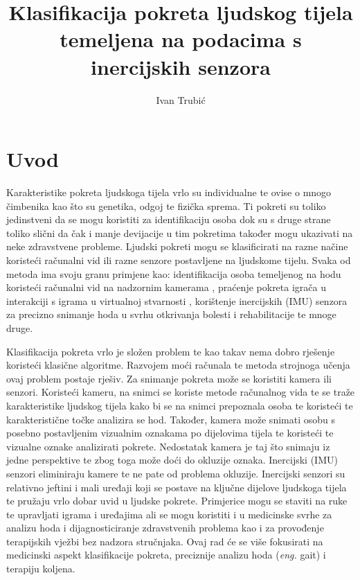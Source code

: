 \documentclass[times, utf8, diplomski]{fer}
\begin{document}

\title{Klasifikacija pokreta ljudskog tijela temeljena na podacima s inercijskih senzora}

\author{Ivan Trubić}

\maketitle


\zahvala{}

\tableofcontents

\chapter{Uvod}
Karakteristike pokreta ljudskoga tijela vrlo su individualne te ovise o mnogo čimbenika kao što su genetika, odgoj te
fizička sprema. Ti pokreti su toliko jedinstveni da se mogu koristiti za identifikaciju osoba dok su s druge strane
toliko slični da čak i manje devijacije u tim pokretima također mogu ukazivati na neke zdravstvene probleme.
Ljudski pokreti mogu se klasificirati na razne načine koristeći računalni vid ili razne senzore postavljene na
ljudskome tijelu. Svaka od metoda ima svoju granu primjene kao: identifikacija osoba temeljenog na hodu koristeći
računalni vid na nadzornim kamerama \citep{surveillance}, praćenje pokreta igrača u interakciji s igrama u virtualnoj stvarnosti \citep{VR},
korištenje inercijskih (IMU) senzora za precizno snimanje hoda u svrhu otkrivanja bolesti i rehabilitacije te mnoge druge.

Klasifikacija pokreta vrlo je složen problem te kao takav nema dobro rješenje koristeći klasične algoritme. Razvojem moći računala
te metoda strojnoga učenja ovaj problem postaje rješiv. Za snimanje pokreta može se koristiti kamera ili senzori.
Koristeći kameru, na snimci se koriste metode računalnog vida te se traže karakteristike ljudskog tijela kako bi se na snimci
prepoznala osoba te koristeći te karakteristične točke analizira se hod. Također, kamera može snimati osobu s posebno postavljenim
vizualnim oznakama po dijelovima tijela te koristeći te vizualne oznake analizirati pokrete. Nedostatak kamera je taj što snimaju iz
jedne perspektive te zbog toga može doći do okluzije oznaka. Inercijski (IMU) senzori eliminiraju kamere te ne pate od problema okluzije.
Inercijski senzori su relativno jeftini i mali uređaji koji se postave na ključne dijelove ljudskoga tijela te pružaju vrlo dobar uvid
u ljudske pokrete. Primjerice mogu se staviti na ruke te upravljati igrama i uređajima ali se mogu koristiti i u medicinske svrhe za
analizu hoda i dijagnosticiranje zdravstvenih problema kao i za provođenje terapijskih vježbi bez nadzora stručnjaka.
Ovaj rad će se više fokusirati na medicinski aspekt klasifikacije pokreta, preciznije analizu hoda (\textit{eng.} gait) i terapiju koljena.
\end{document}
